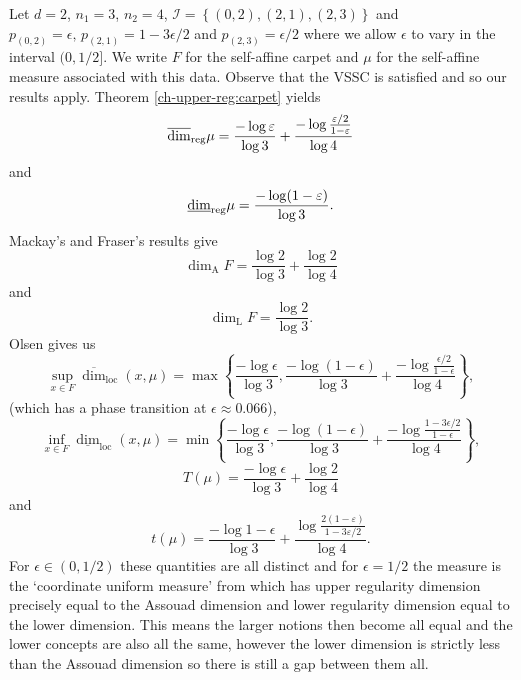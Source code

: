 Let $d=2$, $n_1=3$, $n_2=4$,  $\mathcal{I}=\left\{(0,2),(2,1),(2,3)\right\}$ and $p_{(0,2)}=\epsilon,\, p_{(2,1)}=1-3\epsilon/2$ and $p_{(2,3)}=\epsilon/2$ where we allow $\epsilon$ to vary in the interval $(0,1/2]$.  We write $F$ for the self-affine carpet and $\mu$ for the self-affine measure associated with this data.  Observe that the VSSC is satisfied and so our results apply.  Theorem \ref{ch-upper-reg:carpet} yields
\[
\overline{\dim}_{\textup{reg}} \mu = \frac{-\log \varepsilon}{\log 3}+ \frac{-\log \frac{\varepsilon/2}{1-\varepsilon} }{\log 4}
\]
and 
\[
\underline{\dim}_{\textup{reg}} \mu = \frac{-\log (1 - \varepsilon)}{\log 3}.
\]
Mackay's and Fraser's results give
\[
\dim_{\text{A}} F = \frac{\log 2}{ \log 3} + \frac{ \log 2}{ \log 4} 
\]
and 
\[
\dim_{\text{L}} F = \frac{\log 2}{ \log 3}. 
\]
Olsen gives us
\[
\sup_{x\in F} \overline{\dim}_{\text{loc}}(x,\mu)=\max\left\{ \frac{-\log \epsilon}{\log 3} , \frac{-\log (1-\epsilon)}{\log 3}+\frac{-\log \frac{\epsilon/2}{1-\epsilon} }{\log 4}\right\},
\]
(which has a phase transition at $\epsilon \approx 0.066$),
\[
\inf_{x\in F} \underline{\dim}_{\text{loc}}(x,\mu)=\min\left\{ \frac{-\log \epsilon}{\log 3} , \frac{-\log (1-\epsilon)}{\log 3}+\frac{-\log \frac{1-3\epsilon/2}{1-\epsilon} }{\log 4}\right\},
\]
\[
T(\mu)= \frac{-\log \epsilon }{\log 3} +\frac{\log 2}{\log 4}
\]
and
\[
t(\mu)= \frac{-\log 1- \epsilon }{\log 3} +\frac{\log \frac{2(1-\varepsilon)}{1-3\varepsilon/2} }{\log 4}. 
\]
For $\epsilon \in (0,1/2)$  these quantities are all distinct and for $\epsilon=1/2$ the measure is the `coordinate uniform measure' from \cite{fraser-howroyd1} which has upper regularity dimension precisely equal to the Assouad dimension and lower regularity dimension equal to the lower dimension. This means the larger notions then become all equal and the lower concepts are also all the same, however the lower dimension is strictly less than the Assouad dimension so there is still a gap between them all.



